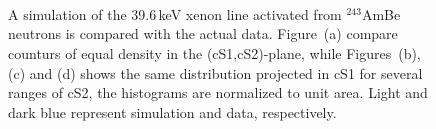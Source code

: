 
\appendix*

\section{}

\begin{figure}[h!]
	 \\
	\caption{A simulation of the 39.6\,keV  xenon line activated from $^{243}$AmBe neutrons is compared with the actual data.
		 Figure~(a) compare counturs of equal density in the (cS1,cS2)-plane, while Figures~(b), (c) and (d) shows the same distribution projected in cS1 for
		 several ranges of cS2, the histograms are normalized to unit area. Light and dark blue represent simulation and data, respectively.
		}
		
  \label{fig:mc_comp}
\end{figure}

